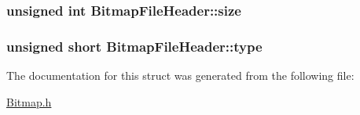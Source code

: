 \subsubsection[{\texorpdfstring{size}{size}}]{\setlength{\rightskip}{0pt plus 5cm}unsigned int Bitmap\+File\+Header\+::size}\hypertarget{structBitmapFileHeader_a0dcad71d9b17783c4d296c2c6d00ede0}{}\label{structBitmapFileHeader_a0dcad71d9b17783c4d296c2c6d00ede0}
\subsubsection[{\texorpdfstring{type}{type}}]{\setlength{\rightskip}{0pt plus 5cm}unsigned short Bitmap\+File\+Header\+::type}\hypertarget{structBitmapFileHeader_a139c2c2645bc00ddf4f5dc552872c1d1}{}\label{structBitmapFileHeader_a139c2c2645bc00ddf4f5dc552872c1d1}


The documentation for this struct was generated from the following file\+:\begin{DoxyCompactItemize}
\item 
\hyperlink{Bitmap_8h}{Bitmap.\+h}\end{DoxyCompactItemize}
